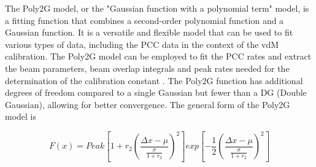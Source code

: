 The Poly2G model, or the "Gaussian function with a polynomial term" model, is a fitting function that combines a second-order polynomial function and a Gaussian function. It is a versatile and flexible model that can be used to fit various types of data, including the PCC data in the context of the vdM calibration. %
The Poly2G model can be employed to fit the PCC rates %
and extract the beam parameters, beam overlap integrals and peak rates  needed for the determination of the calibration constant  %
\cite{Cekmecelioglu:2775639}. The Poly2G function has additional degrees of freedom compared to a single Gaussian but fewer than a DG (Double Gaussian), allowing for better convergence. The general form of the Poly2G model is



\begin{equation}
F(x) = Peak  \left [1+r_2 \left(\frac{\Delta x-\mu} {\frac{\sigma}{1+r_2}}\right)^2 \right] exp \left[-\frac{1}{2}\left(\frac{\Delta x-\mu}{\frac{\sigma}{1+r_2}}\right)^2\right]
\end{equation}

